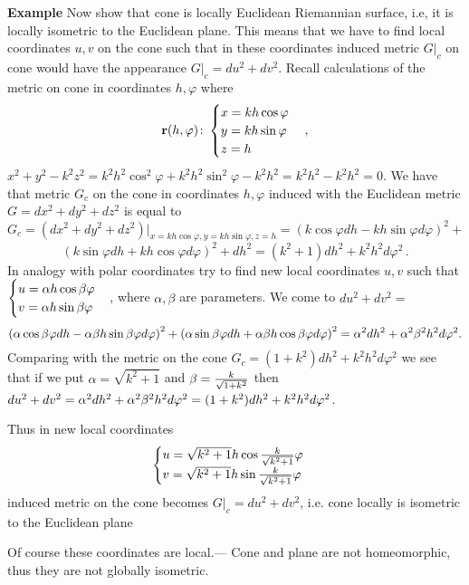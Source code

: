 \documentclass[12pt]{article}
\theoremstyle{theorem}
\numberwithin{equation}{section}
\begin{document}
{\bf Example}
Now show that cone is locally Euclidean Riemannian surface, i.e, it is
locally isometric to the Euclidean  plane.
This means that we have to find local coordinates $u,v$ on the cone such that in these coordinates
  induced metric $G\vert_c$ on cone would have the appearance $G\vert_c=du^2+dv^2$.  Recall calculations of the metric on cone in
coordinates $h,\varphi$ where
             $$
          {\bf r}(h,\varphi)\colon
          \begin{cases}
          x=kh\cos\varphi\cr
          y=kh\sin\varphi\cr
          z=h\cr
          \end{cases},
             $$
$x^2+y^2-k^2z^2=k^2h^2\cos^2\varphi+k^2h^2\sin^2\varphi-
k^2h^2=k^2h^2-k^2h^2=0$.
 We have that metric $G_c$ on the cone in coordinates
$h,\varphi$  induced with
the Euclidean metric $G=dx^2+dy^2+dz^2$ is equal to
                $$
            G_c=\left(dx^2+dy^2+dz^2\right)
\big\vert_{x=kh\cos\varphi, y=kh\sin\varphi, z=h}=
            (k\cos\varphi dh-kh\sin\varphi d\varphi)^2+
            $$
            $$
            (k\sin\varphi dh+kh\cos\varphi d\varphi)^2+dh^2=
            (k^2+1)dh^2+k^2h^2d\varphi^2\,.
                $$
In analogy with polar coordinates try to find new local coordinates $u,v$
such that $\begin{cases} u=\alpha h\cos \beta\varphi\cr v=\alpha h\sin \beta\varphi\end{cases}$,
where $\alpha, \beta$ are parameters. We come to  $du^2+dv^2=$
             $$
    \left(\alpha\cos\beta\varphi dh-\alpha\beta h\sin\beta\varphi d\varphi\right)^2+
  \left(\alpha\sin\beta\varphi dh+\alpha\beta h\cos\beta\varphi d\varphi\right)^2=
  \alpha^2 dh^2+\alpha^2\beta^2 h^2d\varphi^2.
             $$
Comparing with the metric on the cone 
$G_c=(1+k^2)dh^2+k^2h^2d\varphi^2$  
we see that if we put $\alpha=\sqrt {k^2+1}$ and
$\beta={k\over \sqrt{1+k^2}}$
then $du^2+dv^2=\alpha^2 dh^2+\alpha^2\beta^2 h^2d\varphi^2=(1+k^2)dh^2+k^2h^2d\varphi^2$.

Thus in new local coordinates
                  $$
                  \begin{cases}
             u= \sqrt {k^2+1}h\cos {k\over \sqrt {k^2+1}}\varphi\cr
             v=  \sqrt {k^2+1} h\sin {k\over \sqrt {k^2+1}}\varphi\cr
                  \end{cases}
                  $$
induced metric on the cone becomes
$G\vert_c= du^2+dv^2$, i.e. cone locally is isometric to the Euclidean plane \finish

Of course these coordinates are local.---  Cone and plane are not homeomorphic, thus they are not globally isometric.
\end{document}
